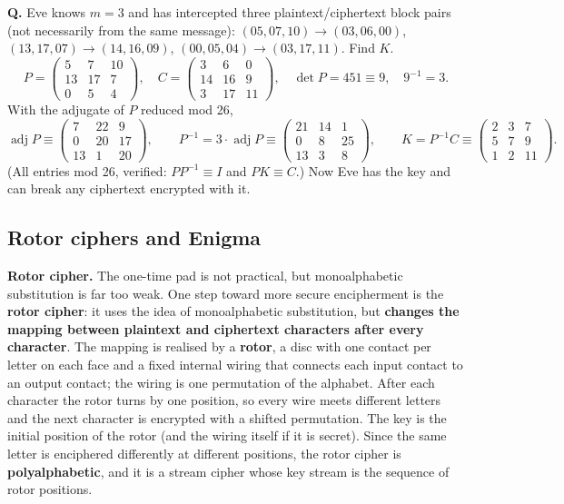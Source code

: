 \begin{worked}[: slide example, $m = 3$]
\textbf{Q.} Eve knows $m = 3$ and has intercepted three plaintext/ciphertext block pairs (not necessarily from the same message): $(05, 07, 10) \to (03, 06, 00)$, $(13, 17, 07) \to (14, 16, 09)$, $(00, 05, 04) \to (03, 17, 11)$. Find $K$.
\[
P = \begin{pmatrix}5&7&10\\13&17&7\\0&5&4\end{pmatrix},\quad
C = \begin{pmatrix}3&6&0\\14&16&9\\3&17&11\end{pmatrix},\quad
\det P = 451 \equiv 9,\quad 9^{-1} = 3 .
\]
With the adjugate of $P$ reduced mod 26,
\[
\operatorname{adj} P \equiv \begin{pmatrix}7&22&9\\0&20&17\\13&1&20\end{pmatrix},\qquad
P^{-1} = 3 \cdot \operatorname{adj} P \equiv \begin{pmatrix}21&14&1\\0&8&25\\13&3&8\end{pmatrix},\qquad
K = P^{-1}C \equiv \begin{pmatrix}2&3&7\\5&7&9\\1&2&11\end{pmatrix}.
\]
(All entries mod 26, verified: $P P^{-1} \equiv I$ and $PK \equiv C$.) Now Eve has the key and can break any ciphertext encrypted with it.
\end{worked}

\subsection{Rotor ciphers and Enigma}
\textbf{Rotor cipher.} The one-time pad is not practical, but monoalphabetic substitution is far too weak. One step toward more secure encipherment is the \textbf{rotor cipher}: it uses the idea of monoalphabetic substitution, but \textbf{changes the mapping between plaintext and ciphertext characters after every character}. The mapping is realised by a \textbf{rotor}, a disc with one contact per letter on each face and a fixed internal wiring that connects each input contact to an output contact; the wiring is one permutation of the alphabet. After each character the rotor turns by one position, so every wire meets different letters and the next character is encrypted with a shifted permutation. The key is the initial position of the rotor (and the wiring itself if it is secret). Since the same letter is enciphered differently at different positions, the rotor cipher is \textbf{polyalphabetic}, and it is a stream cipher whose key stream is the sequence of rotor positions.

